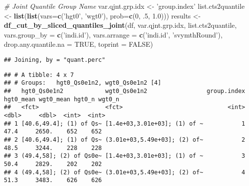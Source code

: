 \documentclass[
]{book}
\newenvironment{Shaded}{\begin{snugshade}}{\end{snugshade}}
\newcommand{\CommentTok}[1]{\textcolor[rgb]{0.56,0.35,0.01}{\textit{#1}}}
\newcommand{\DataTypeTok}[1]{\textcolor[rgb]{0.13,0.29,0.53}{#1}}
\newcommand{\DecValTok}[1]{\textcolor[rgb]{0.00,0.00,0.81}{#1}}
\newcommand{\FloatTok}[1]{\textcolor[rgb]{0.00,0.00,0.81}{#1}}
\newcommand{\KeywordTok}[1]{\textcolor[rgb]{0.13,0.29,0.53}{\textbf{#1}}}
\newcommand{\NormalTok}[1]{#1}
\newcommand{\OperatorTok}[1]{\textcolor[rgb]{0.81,0.36,0.00}{\textbf{#1}}}
\newcommand{\OtherTok}[1]{\textcolor[rgb]{0.56,0.35,0.01}{#1}}
\newcommand{\StringTok}[1]{\textcolor[rgb]{0.31,0.60,0.02}{#1}}
\begin{document}
\begin{Shaded}
\begin{Highlighting}[]
\CommentTok{# Joint Quantile Group Name}
\NormalTok{var.qjnt.grp.idx <-}\StringTok{ 'group.index'}
\NormalTok{list.cts2quantile <-}\StringTok{ }\KeywordTok{list}\NormalTok{(}\KeywordTok{list}\NormalTok{(}\DataTypeTok{vars=}\KeywordTok{c}\NormalTok{(}\StringTok{'hgt0'}\NormalTok{, }\StringTok{'wgt0'}\NormalTok{), }\DataTypeTok{prob=}\KeywordTok{c}\NormalTok{(}\DecValTok{0}\NormalTok{, }\FloatTok{.5}\NormalTok{, }\FloatTok{1.0}\NormalTok{)))}
\NormalTok{results <-}\StringTok{ }\KeywordTok{df_cut_by_sliced_quantiles_joint}\NormalTok{(df, var.qjnt.grp.idx, list.cts2quantile,}
                                            \DataTypeTok{vars.group_by =} \KeywordTok{c}\NormalTok{(}\StringTok{'indi.id'}\NormalTok{), }\DataTypeTok{vars.arrange =} \KeywordTok{c}\NormalTok{(}\StringTok{'indi.id'}\NormalTok{, }\StringTok{'svymthRound'}\NormalTok{),}
                                            \DataTypeTok{drop.any.quantile.na =} \OtherTok{TRUE}\NormalTok{, }\DataTypeTok{toprint =} \OtherTok{FALSE}\NormalTok{)}
\end{Highlighting}
\end{Shaded}

\begin{verbatim}
## Joining, by = "quant.perc"
\end{verbatim}

\begin{Shaded}
\end{Shaded}

\begin{verbatim}
## # A tibble: 4 x 7
## # Groups:   hgt0_Qs0e1n2, wgt0_Qs0e1n2 [4]
##   hgt0_Qs0e1n2            wgt0_Qs0e1n2                 group.index hgt0_mean wgt0_mean hgt0_n wgt0_n
##   <fct>                   <fct>                              <int>     <dbl>     <dbl>  <int>  <int>
## 1 [40.6,49.4]; (1) of Qs~ [1.4e+03,3.01e+03]; (1) of ~           1      47.4     2650.    652    652
## 2 [40.6,49.4]; (1) of Qs~ (3.01e+03,5.49e+03]; (2) of~           2      48.5     3244.    228    228
## 3 (49.4,58]; (2) of Qs0e~ [1.4e+03,3.01e+03]; (1) of ~           3      50.4     2829.    202    202
## 4 (49.4,58]; (2) of Qs0e~ (3.01e+03,5.49e+03]; (2) of~           4      51.3     3483.    626    626
\end{verbatim}
\end{document}
